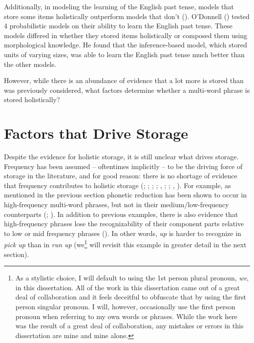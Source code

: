 \documentclass[
  12pt,
  letterpaper,
]{scrreport}
\begin{document}
Additionally, in modeling the learning of the English past tense, models
that store some items holistically outperform models that don't
().
O'Donnell ()
tested 4 probabilistic models on their ability to learn the English past
tense. These models differed in whether they stored items holistically
or composed them using morphological knowledge. He found that the
inference-based model, which stored units of varying sizes, was able to
learn the English past tense much better than the other models.

However, while there is an abundance of evidence that a lot more is
stored than was previously considered, what factors determine whether a
multi-word phrase is stored holistically?

\section{Factors that Drive
Storage}\label{sec-factors-that-drive-storage}

Despite the evidence for holistic storage, it is still unclear what
drives storage. Frequency has been assumed -- oftentimes implicitly --
to be the driving force of storage in the literature, and for good
reason: there is no shortage of evidence that frequency contributes to
holistic storage (;
;
;
; ,
;
; ,
). For example, as
mentioned in the previous section phonetic reduction has been shown to
occur in high-frequency multi-word phrases, but not in their
medium/low-frequency counterparts (; ). In addition to previous examples, there is also evidence that
high-frequency phrases lose the recognizability of their component parts
relative to low or mid frequency phrases
(). In other words, \emph{up} is harder to recognize in
\emph{pick up} than in \emph{run up} (we\footnote{As a stylistic choice,
  I will default to using the 1st person plural pronoun, \emph{we}, in
  this dissertation. All of the work in this dissertation came out of a
  great deal of collaboration and it feels deceitful to obfuscate that
  by using the first person singular pronoun. I will, however,
  occasionally use the first person pronoun when referring to my own
  words or phrases. While the work here was the result of a great deal
  of collaboration, any mistakes or errors in this dissertation are mine
  and mine alone.} will revisit this example in greater detail in the
next section).
\end{document}
